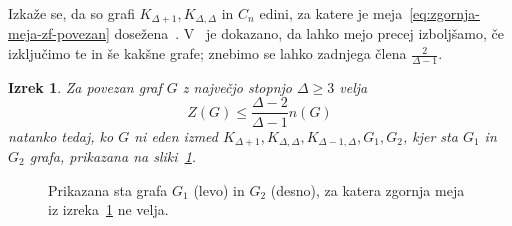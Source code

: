 \documentclass[12pt,a4paper,twoside]{article}
\theoremstyle{definition} %
\theoremstyle{plain} %
\newtheorem{izrek}[definicija]{Izrek}
\numberwithin{equation}{section}  %
\begin{document}
Izkaže se, da so grafi $K_{\Delta + 1}, K_{\Delta, \Delta}$ in $C_n$ edini, za katere je meja~\eqref{eq:zgornja-meja-zf-povezan} dosežena~\cite{lu2016proof, gentner2016extremal}. V~\cite{gentner2018bounds} je dokazano, da lahko mejo precej izboljšamo, če izključimo te in še kakšne grafe; znebimo se lahko zadnjega člena $\frac{2}{\Delta - 1}$.
\begin{izrek}{{\cite[izrek 4]{gentner2018bounds}}}
    \label{izr:zgornja-meja-gentner}
    Za povezan graf $G$ z največjo stopnjo $\Delta \geq 3$ velja
    \[ Z(G) \leq \frac{\Delta-2}{\Delta-1} n(G) \]
    natanko tedaj, ko $G$ ni eden izmed $K_{\Delta + 1}, K_{\Delta, \Delta}, K_{\Delta-1, \Delta}, G_1, G_2$, kjer sta $G_1$ in $G_2$ grafa, prikazana na sliki~\ref{fig:g1g2}.
\end{izrek}
\begin{figure}[h]
    \centering
    \begin{subfigure}{0.49\textwidth}
        \centering
    \end{subfigure}
    \begin{subfigure}{0.5\textwidth}
        \centering
    \end{subfigure}
    \caption{Prikazana sta grafa $G_1$ (levo) in $G_2$ (desno), za katera zgornja meja iz izreka~\ref{izr:zgornja-meja-gentner} ne velja.}
    \label{fig:g1g2}
\end{figure}
\end{document}
